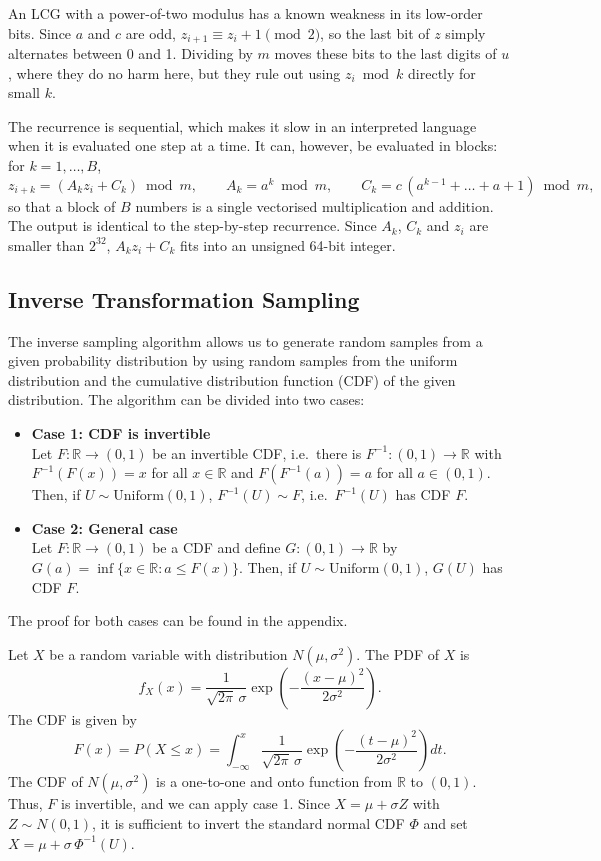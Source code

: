 \documentclass[12pt,a4paper]{article}
\newcommand{\head}[1]{\textbf{#1}\\}
\begin{document}
An LCG with a power-of-two modulus has a known weakness in its low-order bits. Since $a$ and $c$ are odd, $z_{i+1} \equiv z_i + 1 \pmod 2$, so the last bit of $z$ simply alternates between 0 and 1. Dividing by $m$ moves these bits to the last digits of $u$, where they do no harm here, but they rule out using $z_i \bmod k$ directly for small $k$.

The recurrence is sequential, which makes it slow in an interpreted language when it is evaluated one step at a time. It can, however, be evaluated in blocks: for $k = 1, \dots, B$,
\[
z_{i+k} = (A_k z_i + C_k) \bmod m, \qquad A_k = a^k \bmod m, \qquad C_k = c\,(a^{k-1} + \dots + a + 1) \bmod m,
\]
so that a block of $B$ numbers is a single vectorised multiplication and addition. The output is identical to the step-by-step recurrence. Since $A_k$, $C_k$ and $z_i$ are smaller than $2^{32}$, $A_k z_i + C_k$ fits into an unsigned 64-bit integer.

\subsection{Inverse Transformation Sampling}

The inverse sampling algorithm allows us to generate random samples from a given probability distribution by using random samples from the uniform distribution and the cumulative distribution function (CDF) of the given distribution. The algorithm can be divided into two cases:

\begin{itemize}
\item \head{Case 1: CDF is invertible}
Let $F:\mathbb{R}\to(0,1)$ be an invertible CDF, i.e.\ there is $F^{-1}:(0,1)\to\mathbb{R}$ with $F^{-1}(F(x)) = x$ for all $x \in \mathbb{R}$ and $F(F^{-1}(a)) = a$ for all $a \in (0,1)$. Then, if $U \sim \text{Uniform}(0,1)$, $F^{-1}(U) \sim F$, i.e.\ $F^{-1}(U)$ has CDF $F$.
\item \head{Case 2: General case}
Let $F:\mathbb{R}\to(0,1)$ be a CDF and define $G:(0,1)\to\mathbb{R}$ by $G(a) = \inf\{x \in \mathbb{R}: a \le F(x)\}$. Then, if $U \sim \text{Uniform}(0,1)$, $G(U)$ has CDF $F$.
\end{itemize}

The proof for both cases can be found in the appendix.

Let $X$ be a random variable with distribution $N(\mu,\sigma^2)$. The PDF of $X$ is
\[
f_X(x) = \frac{1}{\sqrt{2\pi}\,\sigma}\exp\left(-\frac{(x-\mu)^2}{2\sigma^2}\right).
\]
The CDF is given by
\[
F(x) = P(X \le x) = \int_{-\infty}^{x}\frac{1}{\sqrt{2\pi}\,\sigma}\exp\left(-\frac{(t-\mu)^2}{2\sigma^2}\right)dt.
\]
The CDF of $N(\mu,\sigma^2)$ is a one-to-one and onto function from $\mathbb{R}$ to $(0,1)$. Thus, $F$ is invertible, and we can apply case 1. Since $X = \mu + \sigma Z$ with $Z \sim N(0,1)$, it is sufficient to invert the standard normal CDF $\Phi$ and set $X = \mu + \sigma\,\Phi^{-1}(U)$.
\end{document}
